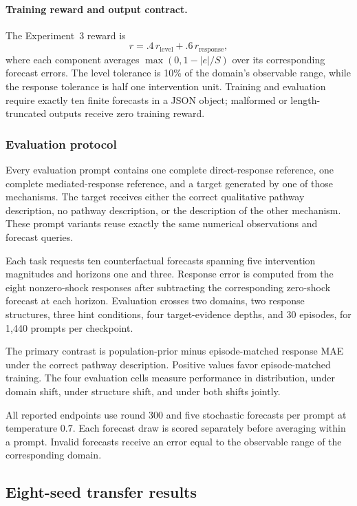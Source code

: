 \paragraph{Training reward and output contract.}

The Experiment~3 reward is
\[
r=.4\,r_{\mathrm{level}}+.6\,r_{\mathrm{response}},
\]
where each component averages \(\max(0,1-|e|/S)\) over its corresponding forecast errors.
The level tolerance is 10\% of the domain's observable range, while the response tolerance is half one intervention unit.
Training and evaluation require exactly ten finite forecasts in a JSON object; malformed or length-truncated outputs receive zero training reward.

\subsubsection{Evaluation protocol}

Every evaluation prompt contains one complete direct-response reference, one complete mediated-response reference, and a target generated by one of those mechanisms.
The target receives either the correct qualitative pathway description, no pathway description, or the description of the other mechanism.
These prompt variants reuse exactly the same numerical observations and forecast queries.

Each task requests ten counterfactual forecasts spanning five intervention magnitudes and horizons one and three.
Response error is computed from the eight nonzero-shock responses after subtracting the corresponding zero-shock forecast at each horizon.
Evaluation crosses two domains, two response structures, three hint conditions, four target-evidence depths, and 30 episodes, for 1,440 prompts per checkpoint.

The primary contrast is population-prior minus episode-matched response MAE under the correct pathway description.
Positive values favor episode-matched training.
The four evaluation cells measure performance in distribution, under domain shift, under structure shift, and under both shifts jointly.

All reported endpoints use round 300 and five stochastic forecasts per prompt at temperature \(0.7\).
Each forecast draw is scored separately before averaging within a prompt.
Invalid forecasts receive an error equal to the observable range of the corresponding domain.

\subsection{Eight-seed transfer results}
\label{app:exp3-eight-seed}

